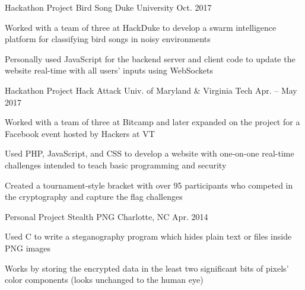 

\begin{cventries}

  \cventry
    {Hackathon Project} %
    {Bird Song} %
    {Duke University} %
    {Oct. 2017} %
    {
      \begin{cvitems} %
      \item {Worked with a team of three at HackDuke to develop a swarm intelligence platform for classifying bird songs in noisy environments}
      \item {Personally used JavaScript for the backend server and client code to update the website real-time with all users' inputs using WebSockets}
      \end{cvitems}
    }

  \cventry
    {Hackathon Project} %
    {Hack Attack} %
    {Univ. of Maryland \& Virginia Tech} %
    {Apr. – May 2017} %
    {
      \begin{cvitems} %
      \item {Worked with a team of three at Bitcamp and later expanded on the project for a Facebook event hosted by Hackers at VT}
      \item {Used PHP, JavaScript, and CSS to develop a website with one-on-one real-time challenges intended to teach basic programming and security}
      \item {Created a tournament-style bracket with over 95 participants who competed in the cryptography and capture the flag challenges}
      \end{cvitems}
    }

  \cventry
    {Personal Project} %
    {Stealth PNG} %
    {Charlotte, NC} %
    {Apr. 2014} %
    {
      \begin{cvitems} %
      \item {Used C to write a steganography program which hides plain text or files inside PNG images}
      \item {Works by storing the encrypted data in the least two significant bits of pixels' color components (looks unchanged to the human eye)}
      \end{cvitems}
    }

\end{cventries}
